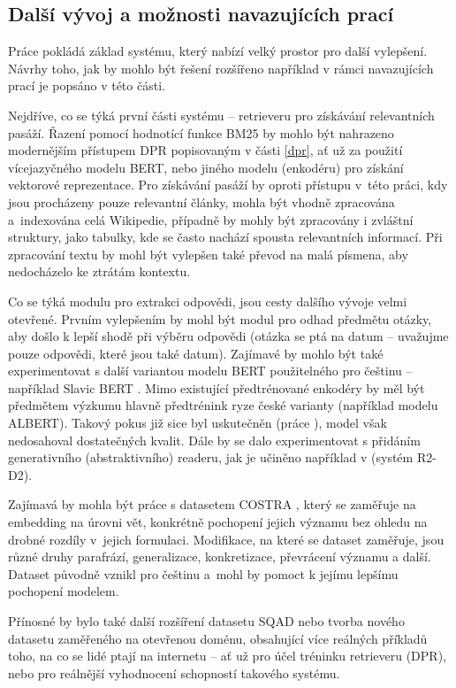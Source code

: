 \subsection{Další vývoj a možnosti navazujících prací}
Práce pokládá základ systému, který nabízí velký prostor pro další vylepšení. Návrhy toho, jak by mohlo být řešení rozšířeno například v rámci navazujících prací je popsáno v této části.\par
Nejdříve, co se týká první části systému -- retrieveru pro získávání relevantních pasáží. Řazení pomocí hodnotící funkce BM25 by mohlo být nahrazeno modernějším přístupem DPR popisovaným v části \ref{dpr}, ať už za použití vícejazyčného modelu BERT, nebo jiného modelu (enkodéru) pro získání vektorové reprezentace. Pro získávání pasáží by oproti přístupu v~této práci, kdy jsou procházeny pouze relevantní články, mohla být vhodně zpracována a~indexována celá Wikipedie, případně by mohly být zpracovány i zvláštní struktury, jako tabulky, kde se často nachází spousta relevantních informací. Při zpracování textu by mohl být vylepšen také převod na malá písmena, aby nedocházelo ke ztrátám kontextu.\par
Co se týká modulu pro extrakci odpovědi, jsou cesty dalšího vývoje velmi otevřené. Prvním vylepšením by mohl být modul pro odhad předmětu otázky, aby došlo k lepší shodě při výběru odpovědi (otázka se ptá na datum -- uvažujme pouze odpovědi, které jsou také datum). Zajímavé by mohlo být také experimentovat s další variantou modelu BERT použitelného pro češtinu -- například Slavic BERT \cite{slavicBERT}. Mimo existující předtrénované enkodéry by měl být předmětem výzkumu hlavně předtrénink ryze české varianty (například modelu ALBERT). Takový pokus již sice byl uskutečněn (práce \cite{Zelina2020thesis}), model však nedosahoval dostatečných kvalit. Dále by se dalo experimentovat s přidáním generativního (abstraktivního) readeru, jak je učiněno například v \cite{fajcik2021pruning} (systém R2-D2).\par
Zajímavá by mohla být práce s datasetem COSTRA \cite{costra}, který se zaměřuje na embedding na úrovni vět, konkrétně pochopení jejich významu bez ohledu na drobné rozdíly v~jejich formulaci. Modifikace, na které se dataset zaměřuje, jsou různé druhy parafrází, generalizace, konkretizace, převrácení významu a další. Dataset původně vznikl pro češtinu a~mohl by pomoct k jejímu lepšímu pochopení modelem.\par
Přínosné by bylo také další rozšíření datasetu SQAD nebo tvorba nového datasetu zaměřeného na otevřenou doménu, obsahující více reálných příkladů toho, na co se lidé ptají na internetu -- ať už pro účel tréninku retrieveru (DPR), nebo pro reálnější vyhodnocení schopností takového systému.

